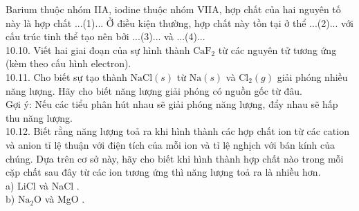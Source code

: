 \documentclass[10pt]{article}
\begin{document}
Barium thuộc nhóm IIA, iodine thuộc nhóm VIIA, hợp chất của hai nguyên tố này là hợp chất ...(1)... Ở điều kiện thường, hợp chất này tồn tại ở thể ...(2)... với cấu trúc tinh thể tạo nên bởi ...(3)... và ...(4)...\\
10.10. Viết hai giai đoạn của sự hình thành $\mathrm{CaF}_{2}$ từ các nguyên tử tương ứng (kèm theo cấu hình electron).\\
10.11. Cho biết sự tạo thành $\mathrm{NaCl}(s)$ từ $\mathrm{Na}(s)$ và $\mathrm{Cl}_{2}(g)$ giải phóng nhiều năng lượng. Hãy cho biết năng lượng giải phóng có nguồn gốc từ đâu.\\
Gợi ý: Nếu các tiểu phân hút nhau sẽ giải phóng năng lượng, đẩy nhau sẽ hấp thu năng lượng.\\
10.12. Biết rằng năng lượng toả ra khi hình thành các hợp chất ion từ các cation và anion tỉ lệ thuận với điện tích của mỗi ion và tỉ lệ nghịch với bán kính của chúng. Dựa trên cơ sở này, hãy cho biết khi hình thành hợp chất nào trong mỗi cặp chất sau đây từ các ion tương ứng thì năng lượng toả ra là nhiều hơn.\\
a) LiCl và NaCl .\\
b) $\mathrm{Na}_{2} \mathrm{O}$ và MgO .
\end{document}
